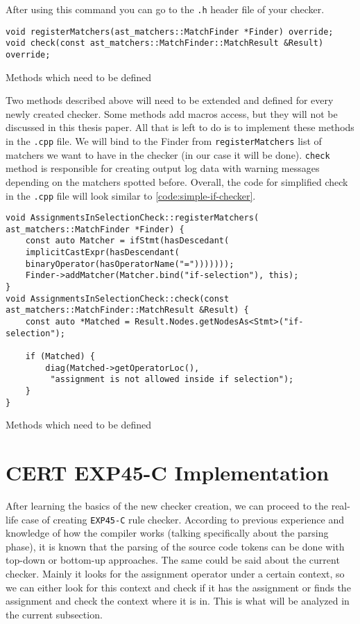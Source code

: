 After using this command you can go to the \lstinline{.h} header file of your checker. 

\begin{listing}[H]
\begin{verbatim}
void registerMatchers(ast_matchers::MatchFinder *Finder) override;
void check(const ast_matchers::MatchFinder::MatchResult &Result) override;
\end{verbatim}
\caption{Methods which need to be defined}
\end{listing}

Two methods described above will need to be extended and defined for every newly created checker. Some methods add macros access, but they will not be discussed in this thesis paper. All that is left to do is to implement these methods in the \lstinline{.cpp} file. We will bind to the Finder from \lstinline{registerMatchers} list of matchers we want to have in the checker (in our case it will be done). \lstinline{check} method is responsible for creating output log data with warning messages depending on the matchers spotted before. Overall, the code for simplified check in the \lstinline{.cpp} file will look similar to \ref{code:simple-if-checker}.

\begin{listing}[H]
\begin{verbatim}
void AssignmentsInSelectionCheck::registerMatchers(
ast_matchers::MatchFinder *Finder) {
    const auto Matcher = ifStmt(hasDescedant(
    implicitCastExpr(hasDescendant(
    binaryOperator(hasOperatorName("=")))))));
    Finder->addMatcher(Matcher.bind("if-selection"), this);
}
void AssignmentsInSelectionCheck::check(const ast_matchers::MatchFinder::MatchResult &Result) {
    const auto *Matched = Result.Nodes.getNodesAs<Stmt>("if-selection");

    if (Matched) {
        diag(Matched->getOperatorLoc(),
         "assignment is not allowed inside if selection");
    } 
}
\end{verbatim}
\caption{Methods which need to be defined}
\label{code:simple-if-checker}
\end{listing}
 


\section{CERT EXP45-C Implementation}

After learning the basics of the new checker creation, we can proceed to the real-life case of creating \lstinline{EXP45-C} rule checker. According to previous experience and knowledge of how the compiler works (talking specifically about the parsing phase), it is known that the parsing of the source code tokens can be done with top-down or bottom-up approaches. The same could be said about the current checker. Mainly it looks for the assignment operator under a certain context, so we can either look for this context and check if it has the assignment or finds the assignment and check the context where it is in. This is what will be analyzed in the current subsection.


